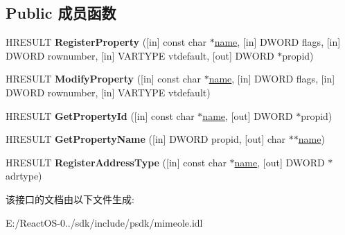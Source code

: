 \subsection*{Public 成员函数}
\begin{DoxyCompactItemize}
\item 
\mbox{\label{interface_m_i_m_e_o_l_e_1_1_i_mime_property_schema_a3f665184635f91516a0b58797c2a5c8c}} 
H\+R\+E\+S\+U\+LT {\bfseries Register\+Property} (\mbox{[}in\mbox{]} const char $\ast$\hyperlink{structname}{name}, \mbox{[}in\mbox{]} D\+W\+O\+RD flags, \mbox{[}in\mbox{]} D\+W\+O\+RD rownumber, \mbox{[}in\mbox{]} V\+A\+R\+T\+Y\+PE vtdefault, \mbox{[}out\mbox{]} D\+W\+O\+RD $\ast$propid)
\item 
\mbox{\label{interface_m_i_m_e_o_l_e_1_1_i_mime_property_schema_a59c4fb2abd89827f16eb85a2be2e1d66}} 
H\+R\+E\+S\+U\+LT {\bfseries Modify\+Property} (\mbox{[}in\mbox{]} const char $\ast$\hyperlink{structname}{name}, \mbox{[}in\mbox{]} D\+W\+O\+RD flags, \mbox{[}in\mbox{]} D\+W\+O\+RD rownumber, \mbox{[}in\mbox{]} V\+A\+R\+T\+Y\+PE vtdefault)
\item 
\mbox{\label{interface_m_i_m_e_o_l_e_1_1_i_mime_property_schema_a812c7bc48bb765d5e1a6dc072bdd3576}} 
H\+R\+E\+S\+U\+LT {\bfseries Get\+Property\+Id} (\mbox{[}in\mbox{]} const char $\ast$\hyperlink{structname}{name}, \mbox{[}out\mbox{]} D\+W\+O\+RD $\ast$propid)
\item 
\mbox{\label{interface_m_i_m_e_o_l_e_1_1_i_mime_property_schema_a82003ac128ba6cbbf94d423c8cc3613a}} 
H\+R\+E\+S\+U\+LT {\bfseries Get\+Property\+Name} (\mbox{[}in\mbox{]} D\+W\+O\+RD propid, \mbox{[}out\mbox{]} char $\ast$$\ast$\hyperlink{structname}{name})
\item 
\mbox{\label{interface_m_i_m_e_o_l_e_1_1_i_mime_property_schema_a8027116c7b3719c1f98a7395a695cb19}} 
H\+R\+E\+S\+U\+LT {\bfseries Register\+Address\+Type} (\mbox{[}in\mbox{]} const char $\ast$\hyperlink{structname}{name}, \mbox{[}out\mbox{]} D\+W\+O\+RD $\ast$adrtype)
\end{DoxyCompactItemize}


该接口的文档由以下文件生成\+:\begin{DoxyCompactItemize}
\item 
E\+:/\+React\+O\+S-\/0../sdk/include/psdk/mimeole.\+idl\end{DoxyCompactItemize}
